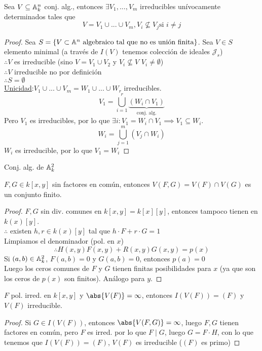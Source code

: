 \begin{thm}
    Sea $V\subseteq\mathbb{A}_k^n$ conj. alg., entonces $\exists V_1,...,V_m$ irreducibles unívocamente determinados tales que
    \[
        V=V_1\cup...\cup V_m, V_i\nsubseteq V_j\text{si }i\neq j
    \]
\end{thm}

\begin{proof}
    Sea $S=\{V\subset\mathbb{A}^n\text{ algebraico tal que no es unión finita}\}$. Sea $V\in S$ elemento minimal (a través de $I(V)$ tenemos colección de ideales $\mathcal{J}_s$)\\
    $\therefore V$ es irreducible (sino $V=V_1\cup V_2$ y $V_i\nsubseteq V$ $V_i\neq\emptyset$)\\
    $\therefore V$ irreducible no por definición\\
    $\therefore S=\emptyset$\\
    \underline{Unicidad}:$V_1\cup...\cup V_m=W_1\cup...\cup W_r$ irreducibles.
    \[
        V_1=\bigcup_{i=1}^r\underbrace{(W_i\cap V_1)}_\text{conj. alg.}
    \]
    Pero $V_1$ es irreducibles, por lo que $\exists i: V_1=W_i\cap V_1\implies V_1\subseteq W_i$.
    \[
        W_i=\bigcup_{j=1}^m(V_j\cap W_i)
    \]
    $W_i$ es irreducible, por lo que $V_1=W_i$
\end{proof}

Conj. alg. de $\mathbb{A}_k^2$
\begin{prop}
    $F,G\in k[x,y]$ sin factores en común, entonces $V(F,G)=V(F)\cap V(G)$ es un conjunto finito.
\end{prop}

\begin{proof}
    $F,G$ sin div. comunes en $k[x,y]=k[x][y]$, entonces tampoco tienen en $k(x)[y]$.\\
    $\therefore$ existen $h,r\in k(x)[y]$ tal que $h\cdot F+r\cdot G=1$\\
    Limpiamos el denominador (pol. en $x$)
    \[
        \therefore H(x,y)F(x,y)+R(x,y)G(x,y)=p(x)
    \]
    Si $(a,b)\in\mathbb{A}_k^2$, $F(a,b)=0$ y $G(a,b)=0$, entonces $p(a)=0$\\
    Luego los ceros comunes de $F$ y $G$ tienen finitas posibilidades para $x$ (ya que son los ceros de $p(x)$ son finitos). Análogo para $y$.
\end{proof}

\begin{cor}
    $F$ pol. irred. en $k[x,y]$ y $\abs{V(F)}=\infty$, entonces $I(V(F))=(F)$ y $V(F)$ irreducible.
\end{cor}
\begin{proof}
    Si $G\in I(V(F))$, entonces $\abs{V(F,G)}=\infty$, luego $F,G$ tienen factores en común, pero $F$ es irred. por lo que $F\mid G$, luego $G=F\cdot H$, con lo que tenemos que $I(V(F))=(F)$, $V(F)$ es irreducible ($(F)$ es primo)
\end{proof}

